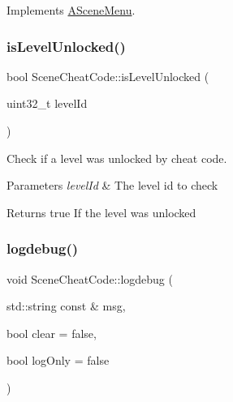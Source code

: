 Implements \hyperlink{class_a_scene_menu_a78bdee98bd7df224524586a060f9bdec}{A\+Scene\+Menu}.

\mbox{\label{class_scene_cheat_code_a4694632bb07f80ac6668ba0e9cfcb63e}} 
\subsubsection{\texorpdfstring{is\+Level\+Unlocked()}{isLevelUnlocked()}}
{\footnotesize\ttfamily bool Scene\+Cheat\+Code\+::is\+Level\+Unlocked (\begin{DoxyParamCaption}\item[{uint32\+\_\+t}]{level\+Id }\end{DoxyParamCaption})\hspace{0.3cm}{\ttfamily [static]}}



Check if a level was unlocked by cheat code. 


\begin{DoxyParams}{Parameters}
{\em level\+Id} & The level id to check \\
\hline
\end{DoxyParams}
\begin{DoxyReturn}{Returns}
true If the level was unlocked 
\end{DoxyReturn}
\mbox{\label{class_scene_cheat_code_a1e333ad7c13d00f08728447e2ef3cd97}} 
\subsubsection{\texorpdfstring{logdebug()}{logdebug()}}
{\footnotesize\ttfamily void Scene\+Cheat\+Code\+::logdebug (\begin{DoxyParamCaption}\item[{std\+::string const \&}]{msg,  }\item[{bool}]{clear = {\ttfamily false},  }\item[{bool}]{log\+Only = {\ttfamily false} }\end{DoxyParamCaption})}



